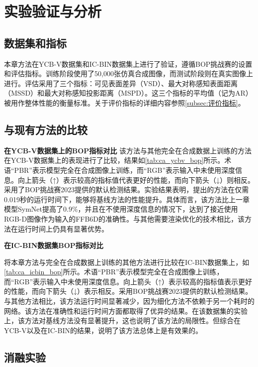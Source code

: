 \section{实验验证与分析}

\subsection{数据集和指标}
本章方法在YCB-V数据集\cite{ycbv}和IC-BIN数据集\cite{icbin}上进行了验证，遵循BOP挑战赛\cite{hodan2024bop}的设置和评估指标。训练阶段使用了50,000张仿真合成图像，而测试阶段则在真实图像上进行。评估采用了三个指标：可见表面差异（VSD）、最大对称感知表面距离（MSSD）和最大对称感知投影距离（MSPD）。这三个指标的平均值（记为AR）被用作整体性能的衡量标准。关于评价指标的详细内容参照\autoref{subsec:评价指标}。

\subsection{与现有方法的比较}

\textbf{在YCB-V数据集上的BOP指标对比 } 该方法与其他完全在合成数据上训练的方法在YCB-V数据集上的表现进行了比较，结果如\autoref{tab:ca_ycbv_bop}所示。术语“PBR”表示模型完全在合成图像上训练，而“RGB”表示输入中未使用深度信息。向上箭头（↑）表示较高的指标值代表更好的性能，而向下箭头（↓）则相反。采用了BOP挑战赛2023\cite{hodan2024bop}提供的默认检测结果。实验结果表明，提出的方法在仅需0.019秒的运行时间下，能够将基线方法的性能提升。具体而言，该方法比上一章模型SymNet\cite{symnet}提高了$0.9\%$，并且在不使用深度信息的情况下，达到了接近使用RGB-D图像作为输入的FFB6D\cite{he2021ffb6d}的准确性。与其他需要渲染优化的技术相比，该方法在运行时间上仍具有显著优势。



\textbf{在IC-BIN数据集BOP指标对比}

将本章方法与完全在合成数据上训练的其他方法进行比较在IC-BIN数据集上，如\autoref{tab:ca_icbin_bop}所示。术语“PBR”表示模型完全在合成图像上训练，而“RGB”表示输入中未使用深度信息。向上箭头（↑）表示较高的指标值表示更好的性能，而向下箭头（↓）表示相反。采用BOP挑战赛2023\cite{hodan2024bop}提供的默认检测结果。与其他方法相比，该方法运行时间显著减少，因为细化方法不依赖于另一个耗时的网络。该方法在准确性和运行时间方面都取得了优异的结果。在该数据集的实验上，该方法对基线方法没有显著提升，这也说明了该方法的局限性。但综合在YCB-V以及在IC-BIN的结果，说明了该方法总体上是有效果的。



\subsection{消融实验}

